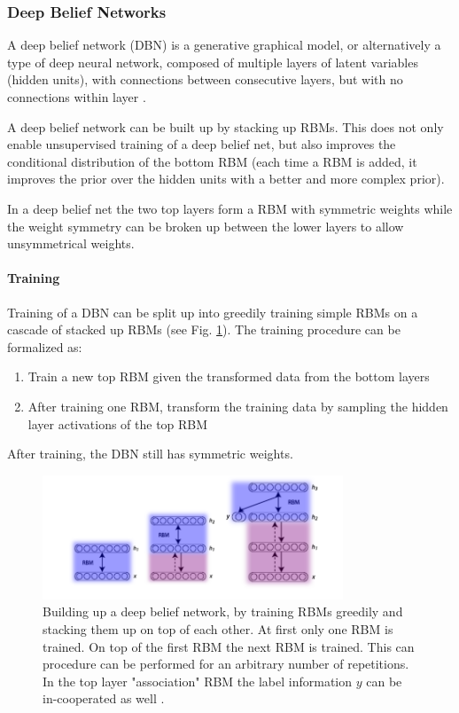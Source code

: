 \subsubsection{Deep Belief Networks} \label{c:dbns}

A deep belief network (DBN) is a generative graphical model, or alternatively a type of deep neural network, composed of multiple layers of latent variables (hidden units), with connections between consecutive layers, but with no connections within layer \cite{hinton2006fast} \cite{hinton2009deep} \cite{Goodfellow-et-al-2016-Book}.

A deep belief network can be built up by stacking up RBMs.
This does not only enable unsupervised training of a deep belief net, but also improves the conditional distribution of the bottom RBM (each time a RBM is added, it improves the prior over the hidden units with a better and more complex prior).

In a deep belief net the two top layers form a RBM with symmetric weights while the weight symmetry can be broken up between the lower layers to allow unsymmetrical weights.   

\paragraph{Training} \label{c:dbntraining}

Training of a DBN can be split up into greedily training simple RBMs on a cascade of stacked up RBMs (see Fig. \ref{fig:dbn}).
The training procedure can be formalized as:  
\begin{enumerate}
\item Train a new top RBM given the transformed data from the bottom layers
\item After training one RBM, transform the training data by sampling the hidden layer activations of the top RBM
\end{enumerate}

After training, the DBN still has symmetric weights. 

\begin{figure}
	\centering
    	\includegraphics[width=0.8\textwidth]{imgs/dbn_stacking.png} 
    \caption{Building up a deep belief network, by training RBMs greedily and stacking them up on top of each other. At first only one RBM is trained. On top of the first RBM the next RBM is trained. This can procedure can be performed for an arbitrary number of repetitions. In the top layer "association" RBM the label information $y$ can be in-cooperated as well \cite{DBNImg}.}
	\label{fig:dbn}
\end{figure}

